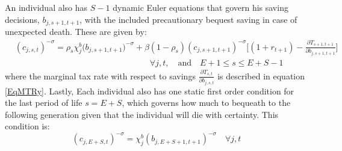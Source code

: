 \documentclass[letterpaper,12pt]{article}
\theoremstyle{definition}
\begin{document}
\begin{spacing}{1.5}
    An individual also has $S-1$ dynamic Euler equations that govern his saving decisions, $b_{j,s+1,t+1}$, with the included precautionary bequest saving in case of unexpected death. These are given by:
    \begin{equation}\label{EqEulerSavGen}
      \begin{split}
        &(c_{j,s,t})^{-\sigma} = \rho_s\chi^b_j\bigl(b_{j,s+1,t+1}\bigr)^{-\sigma} + \beta(1-\rho_s)(c_{j,s+1,t+1})^{-\sigma}\Biggl[(1 + r_{t+1}) - \frac{\partial T_{s+1,t+1}}{\partial b_{j,s+1,t+1}}\Biggr] \\
        &\qquad\qquad\qquad\qquad\qquad\qquad\qquad\qquad\forall j,t,\quad\text{and}\quad E+1\leq s \leq E+S-1
      \end{split}
    \end{equation}
    where the marginal tax rate with respect to savings $\frac{\partial T_{s,t}}{\partial b_{j,s,t}}$ is described in equation \ref{EqMTRy}. Lastly, Each individual also has one static first order condition for the last period of life $s=E+S$, which governs how much to bequeath to the following generation given that the individual will die with certainty.  This condition is:
    \begin{equation}\label{EqEulerSavEpS}
      (c_{j,E+S,t})^{-\sigma} = \chi^b_j(b_{j,E+S+1,t+1})^{-\sigma} \quad\forall j,t
    \end{equation}


\end{spacing}
\end{document}
